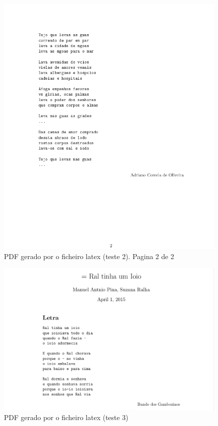 \begin{figure}
\includegraphics[width=15cm]{anexos/2-5-b-img2.png}
\caption{PDF gerado por o ficheiro latex (teste 2). Pagina 2 de 2}
\label{fig::anex-music-test-img}
\end{figure}


\begin{figure}
\centering
\includegraphics[width=15cm]{anexos/2-5-c-img.png}
\caption{PDF gerado por o ficheiro latex (teste 3)}
\label{fig::anex-music-test-img03}
\end{figure}